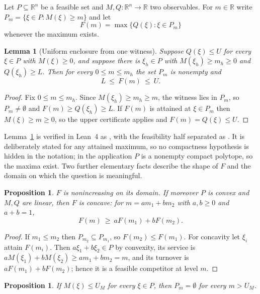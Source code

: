 \documentclass[11pt,a4paper]{article}
\theoremstyle{plain}
\newtheorem{proposition}[theorem]{Proposition}
\newtheorem{lemma}[theorem]{Lemma}
\theoremstyle{definition}
\theoremstyle{remark}
\newcommand{\R}{\mathbb R}
\begin{document}
Let $P\subseteq\R^n$ be a feasible set and $M,Q:\R^n\to\R$ two observables.
For $m\in\R$ write $P_m=\{\xi\in P: M(\xi)\ge m\}$ and let
\begin{equation}\label{eq:F}
F(m)=\max\{Q(\xi):\xi\in P_m\}
\end{equation}
whenever the maximum exists.

\begin{lemma}[Uniform enclosure from one witness]\label{lem:enclosure}
Suppose $Q(\xi)\le U$ for every $\xi\in P$ with $M(\xi)\ge0$, and suppose there
is $\xi_h\in P$ with $M(\xi_h)\ge m_h\ge 0$ and $Q(\xi_h)\ge L$. Then for every
$0\le m\le m_h$ the set $P_m$ is nonempty and
\[
L\ \le\ F(m)\ \le\ U .
\]
\end{lemma}

\begin{proof}
Fix $0\le m\le m_h$. Since $M(\xi_h)\ge m_h\ge m$, the witness lies in $P_m$,
so $P_m\ne\emptyset$ and $F(m)\ge Q(\xi_h)\ge L$. If $F(m)$ is attained at
$\xi\in P_m$ then $M(\xi)\ge m\ge0$, so the upper certificate applies and
$F(m)=Q(\xi)\le U$.
\end{proof}

Lemma~\ref{lem:enclosure} is verified in Lean~4 as
, with the feasibility half separated
as . It is deliberately stated for any attained
maximum, so no compactness hypothesis is hidden in the notation; in the application $P$ is a nonempty
compact polytope, so the maxima exist. Two further elementary facts describe
the shape of $F$ and the domain on which the question is meaningful.

\begin{proposition}\label{prop:shape}
$F$ is nonincreasing on its domain. If moreover $P$ is convex and $M,Q$ are
linear, then $F$ is concave: for $m=am_1+bm_2$ with $a,b\ge0$ and $a+b=1$,
\[
F(m)\ \ge\ aF(m_1)+bF(m_2).
\]
\end{proposition}

\begin{proof}
If $m_1\le m_2$ then $P_{m_2}\subseteq P_{m_1}$, so $F(m_2)\le F(m_1)$. For
concavity let $\xi_i$ attain $F(m_i)$. Then $a\xi_1+b\xi_2\in P$ by convexity,
its service is $aM(\xi_1)+bM(\xi_2)\ge am_1+bm_2=m$, and its turnover is
$aF(m_1)+bF(m_2)$; hence it is a feasible competitor at level $m$.
\end{proof}

\begin{proposition}\label{prop:ceiling}
If $M(\xi)\le U_M$ for every $\xi\in P$, then $P_m=\emptyset$ for every
$m>U_M$.
\end{proposition}
\end{document}

